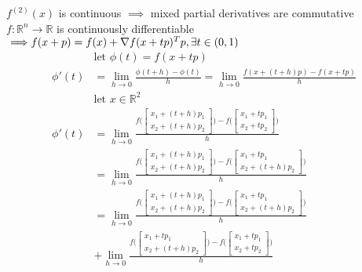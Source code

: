 \documentclass[12pt,letter]{article}
\newcommand{\R}{\mathbb{R}}
\newcommand{\te}[1]{\text{#1 }}
\begin{document}
  $f^{(2)}(x)$ is continuous $\implies$ mixed partial derivatives are commutative\\
  $f: \R^n \to \R$ is continuously differentiable $\implies \\ f(x+p)=f(x)+\nabla f(x+tp)^T p, \exists t\in(0,1)$
  \begin{align*}
    &\te{let} \phi(t) = f(x+tp)\\
    \phi'(t) &= \lim_{h\to 0} \frac{\phi(t+h)-\phi(t)}{h} = \lim_{h\to 0}\frac{f(x+(t+h)p)-f(x+tp)}{h}\\
    &\te{let }x\in\R^2\\
    \phi'(t) &= \lim_{h\to 0} \frac{f\bigg(
               \begin{bmatrix}
                 x_1+(t+h)p_1\\
                 x_2+(t+h)p_2
               \end{bmatrix}\bigg)
    -f\bigg(\begin{bmatrix}
      x_1+tp_1\\
      x_2+tp_2
    \end{bmatrix}\bigg)}{h}\\
    &=\lim_{h\to 0}
      \frac{f\bigg(\begin{bmatrix}
          x_1+(t+h)p_1\\
          x_2+(t+h)p_2
        \end{bmatrix}\bigg)
    -f\bigg(
    \begin{bmatrix}
      x_1+tp_1\\
      x_2+(t+h)p_2
    \end{bmatrix}\bigg)}{h}\\
    &=\lim_{h\to 0}\frac{f\bigg(
      \begin{bmatrix}
        x_1+(t+h)p_1\\
        x_2+(t+h)p_2
      \end{bmatrix}
    \bigg)
    -f\bigg(
    \begin{bmatrix}
      x_1+tp_1\\
      x_2+(t+h)p_2
    \end{bmatrix}
    \bigg)}
    {h}\\
    &+\lim_{h\to 0}\frac{f\bigg(
      \begin{bmatrix}
        x_1+tp_1\\
        x_2+(t+h)p_2
      \end{bmatrix}
    \bigg)
    -f\bigg(
    \begin{bmatrix}
      x_1+tp_1\\
      x_2+tp_2
    \end{bmatrix}
    \bigg)}
    {h}
  \end{align*}
\end{document}
